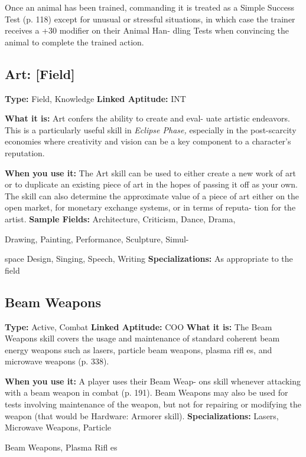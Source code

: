 Once an animal has been trained, commanding 
it is treated as a Simple Success Test (p. 118) except 
for unusual or stressful situations, in which case the 
trainer receives a +30 modifier on their Animal Han-
dling Tests when convincing the animal to complete 
the trained action.

\subsection{Art: [Field]}

\textbf{Type: }Field, Knowledge
\textbf{Linked Aptitude:} INT

\textbf{What it is:} Art confers the ability to create and eval-
uate artistic endeavors. This is a particularly useful 
skill in \textit{Eclipse Phase,} especially in the post-scarcity 
economies where creativity and vision can be a key 
component to a character's reputation.

\textbf{When you use it:} The Art skill can be used to either 
create a new work of art or to duplicate an existing 
piece of art in the hopes of passing it off as your 
own. The skill can also determine the approximate 
value of a piece of art either on the open market, for 
monetary exchange systems, or in terms of reputa-
tion for the artist.
\textbf{Sample Fields:} Architecture, Criticism, Dance, Drama, 

Drawing, Painting, Performance, Sculpture, Simul-

space Design, Singing, Speech, Writing
\textbf{Specializations:} As appropriate to the field

\subsection{Beam Weapons}

\textbf{Type:} Active, Combat
\textbf{Linked Aptitude:} COO
\textbf{What it is:} The Beam Weapons skill covers the usage 
and maintenance of standard coherent beam energy 
weapons such as lasers, particle beam weapons, 
plasma rifl es, and microwave weapons (p. 338).

\textbf{When you use it:} A player uses their Beam Weap-
ons skill whenever attacking with a beam weapon in 
combat (p. 191). Beam Weapons may also be used for 
tests involving maintenance of the weapon, but not 
for repairing or modifying the weapon (that would be 
Hardware: Armorer skill).
\textbf{Specializations:} Lasers, Microwave Weapons, Particle 

Beam Weapons, Plasma Rifl es

